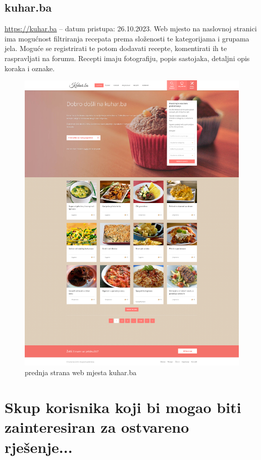		\subsection{kuhar.ba}
			\url{https://kuhar.ba} -- datum pristupa: 26.10.2023.
			Web mjesto na naslovnoj stranici ima mogućnost filtriranja recepata prema složenosti te kategorijama i grupama jela. Moguće se registrirati te potom dodavati recepte, komentirati ih te raspravljati na forumu. Recepti imaju fotografiju, popis sastojaka, detaljni opis koraka i oznake.
				\begin{figure}[H]
					\centering
					\includegraphics[scale=0.1]{slike/02-01-kuhar-ba.PNG}
					\caption{prednja strana web mjesta kuhar.ba}
					\label{fig:kuhar-ba-front}
				\end{figure} 
	

	\section{Skup korisnika koji bi mogao biti zainteresiran za ostvareno rješenje...}
